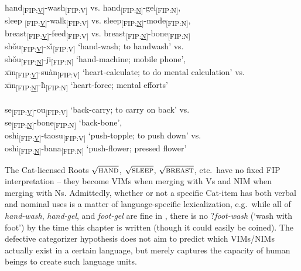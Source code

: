 \documentclass[output=paper]{langsci/langscibook}
\begin{document}
\ea\label{ex:nim}
\\
hand{\textsubscript{[FIP:\uline{V}]}}-wash{\textsubscript{[FIP:V]} vs.} hand{\textsubscript{[FIP:\uline{N}]}}-gel{\textsubscript{[FIP:N]},}\\
sleep {\textsubscript{[FIP:\uline{V}]}}-walk{\textsubscript{[FIP:V]} vs.} sleep{\textsubscript{[FIP:\uline{N}]}}-mode{\textsubscript{[FIP:N]},}\\
breast{\textsubscript{[FIP:\uline{V}]}}-feed{\textsubscript{[FIP:V]} vs.} breast{\textsubscript{[FIP:\uline{N}]}}-bone{\textsubscript{[FIP:N]}%
}
\\
sh\v{o}u{\textsubscript{[FIP:\uline{V}]}}-x\v{\i}{\textsubscript{[FIP:V]} `hand-wash; to handwash'} {vs.}\\
sh\v{o}u{\textsubscript{[FIP:\uline{N}]}}-j\={\i}{\textsubscript{[FIP:N]} `hand-machine; mobile phone',}\\
x\={\i}n{\textsubscript{[FIP:\uline{V}]}}-su\`{a}n{\textsubscript{[FIP:V]} `heart-calculate; to do mental calculation'} {vs.}\\
x\={\i}n{\textsubscript{[FIP:\uline{N}]}}-l\`{\i}{\textsubscript{[FIP:N]} `heart-force; mental efforts'}\\
\\
se{\textsubscript{[FIP:\uline{V}]}}-ou{\textsubscript{[FIP:V]} `back-carry; to carry on back'} {vs.}\\
se{\textsubscript{[FIP:\uline{N}]}}-bone{\textsubscript{[FIP:N]}} {`back-bone',}\\
oshi{\textsubscript{[FIP:\uline{V}]}}-taosu{\textsubscript{[FIP:V]} `push-topple; to push down'} {vs.}\\
oshi{\textsubscript{[FIP:\uline{N}]}}-bana{\textsubscript{[FIP:N]}} {`push-flower; pressed flower'}\\
\z
\z

The Cat-licensed Roots $\sqrt{\textrm{\textsc{hand}}}$,
$\sqrt{\textrm{\textsc{sleep}}}$, $\sqrt{\textrm{\textsc{breast}}}$, etc.\ have
no fixed \gls{FIP} interpretation -- they become \glspl{VIM} when merging with V\textsubscript{\textsurd}s and NIM when
merging with N\textsubscript{\textsurd}s. Admittedly, whether or not a specific
Cat-item has both verbal and nominal uses is a matter of language-specific
lexicalization, e.g.\ while all of {\it hand-wash}, {\it hand-gel}, and {\it
foot-gel} are fine in , there is no ?{\it foot-wash} (`wash with
foot') by the time this chapter is written (though it could easily be coined).
The defective categorizer hypothesis does not aim to predict which
\glspl{VIM}/NIMs actually exist in a certain language, but merely
captures the capacity of human beings to create such language units.
\end{document}
